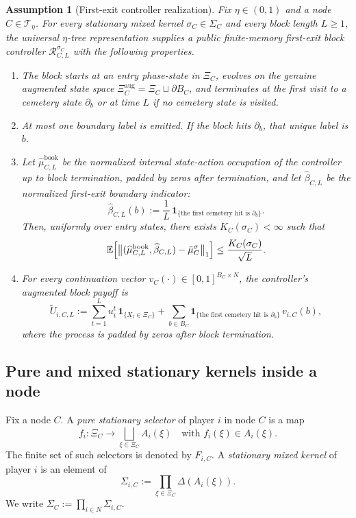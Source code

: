 \documentclass[12pt]{article}
\newtheorem{assumption}[theorem]{Assumption}
\theoremstyle{definition}
\newcommand{\E}{\mathbb{E}}
\newcommand{\1}{\mathbf{1}}
\newcommand{\cT}{\mathcal{T}}
\begin{document}
\begin{assumption}[First-exit controller realization]
\label{ass:controller-input}
Fix $\eta\in(0,1)$ and a node $C\in\cT_\eta$. For every stationary mixed kernel
$\sigma_C\in\Sigma_C$ and every block length $L\ge 1$, the universal
$\eta$-tree representation supplies a public finite-memory first-exit block
controller $\mathcal R_{C,L}^{\sigma_C}$ with the following properties.
\begin{enumerate}[label=\textnormal{(R\arabic*)},leftmargin=2.8em]
\item The block starts at an entry phase-state in $\Xi_C$, evolves on the genuine
augmented state space $\Xi_C^{\mathrm{aug}}=\Xi_C\sqcup\partial B_C$, and
terminates at the first visit to a cemetery state $\partial_b$ or at time $L$ if
no cemetery state is visited.
\item At most one boundary label is emitted. If the block hits $\partial_b$, that
unique label is $b$.
\item Let $\widehat\mu_{C,L}^{\mathrm{book}}$ be the normalized internal
state-action occupation of the controller up to block termination, padded by zeros
after termination, and let $\widehat\beta_{C,L}$ be the normalized first-exit
boundary indicator:
\[
\widehat\beta_{C,L}(b):=\frac1L\,\1_{\{\text{the first cemetery hit is }\partial_b\}}.
\]
Then, uniformly over entry states, there exists $K_C(\sigma_C)<\infty$ such that
\begin{equation}
\label{eq:controller-input-occ}
\E\Bigl[
\bigl\|(\widehat\mu_{C,L}^{\mathrm{book}},\widehat\beta_{C,L})
-
\bar\mu_C^\sigma
\bigr\|_1
\Bigr]
\le \frac{K_C(\sigma_C)}{\sqrt L}.
\end{equation}
\item For every continuation vector $v_C(\cdot)\in[0,1]^{B_C\times N}$, the
controller's augmented block payoff is
\[
\widetilde U_{i,C,L}
:=
\sum_{t=1}^{L} u_i^t\,\1_{\{X_t\in \Xi_C\}}
+
\sum_{b\in B_C}\1_{\{\text{the first cemetery hit is }\partial_b\}}\,v_{i,C}(b),
\]
where the process is padded by zeros after block termination.
\end{enumerate}
\end{assumption}

\subsection{Pure and mixed stationary kernels inside a node}

Fix a node $C$. A \emph{pure stationary selector} of player $i$ in node $C$ is a
map
\[
f_i: \Xi_C\to \bigsqcup_{\xi\in\Xi_C}A_i(\xi)
\quad\text{with }f_i(\xi)\in A_i(\xi).
\]
The finite set of such selectors is denoted by $F_{i,C}$. A \emph{stationary
mixed kernel} of player $i$ is an element of
\[
\Sigma_{i,C}:=\prod_{\xi\in\Xi_C}\Delta(A_i(\xi)).
\]
We write $\Sigma_C:=\prod_{i\in N}\Sigma_{i,C}$.
\end{document}
